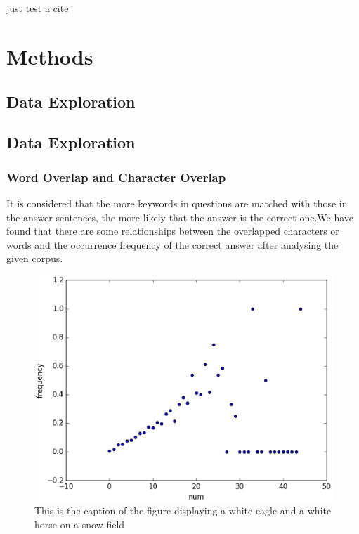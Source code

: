 \documentclass{llncs}
\begin{document}
\section{}
just test a cite\cite{severyn2015learning}

\section{Methods}

\subsection{Data Exploration}

\subsection{Data Exploration}

\subsubsection{Word Overlap and Character Overlap}
It is considered that the more keywords in questions are matched with those in the answer sentences, the more likely that the answer is the correct one.We have found that there are some relationships between the overlapped characters or words and the occurrence frequency of the correct answer after analysing the given corpus.


\begin{figure}[htb]
\vspace{2.5cm}
\centering
\includegraphics[width=5in]{figures/character_overlap.eps}
\caption{This is the caption of the figure displaying a white eagle and
a white horse on a snow field}
\label{fig:word_character}
\end{figure}
\end{document}
